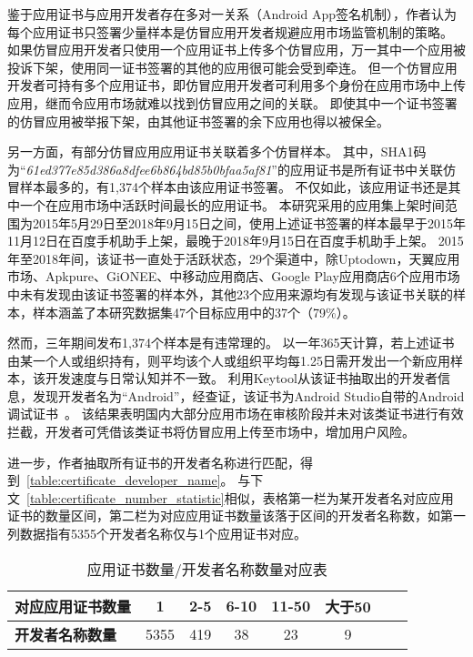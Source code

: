 鉴于应用证书与应用开发者存在多对一关系（Android App签名机制），作者认为每个应用证书只签署少量样本是仿冒应用开发者规避应用市场监管机制的策略。
如果仿冒应用开发者只使用一个应用证书上传多个仿冒应用，万一其中一个应用被投诉下架，使用同一证书签署的其他的应用很可能会受到牵连。
但一个仿冒应用开发者可持有多个应用证书，即仿冒应用开发者可利用多个身份在应用市场中上传应用，继而令应用市场就难以找到仿冒应用之间的关联。
即使其中一个证书签署的仿冒应用被举报下架，由其他证书签署的余下应用也得以被保全。

另一方面，有部分仿冒应用应用证书关联着多个仿冒样本。
其中，SHA1码为``\emph{61ed377e85d386a8dfee6b864bd85b0bfaa5af81}''的应用证书是所有证书中关联仿冒样本最多的，有1,374个样本由该应用证书签署。
不仅如此，该应用证书还是其中一个在应用市场中活跃时间最长的应用证书。
本研究采用的应用集上架时间范围为2015年5月29日至2018年9月15日之间，使用上述证书签署的样本最早于2015年11月12日在百度手机助手上架，最晚于2018年9月15日在百度手机助手上架。
2015年至2018年间，该证书一直处于活跃状态，29个渠道中，除Uptodown，天翼应用市场、Apkpure、GiONEE、中移动应用商店、Google Play应用商店6个应用市场中未有发现由该证书签署的样本外，其他23个应用来源均有发现与该证书关联的样本，样本涵盖了本研究数据集47个目标应用中的37个（79\%）。

然而，三年期间发布1,374个样本是有违常理的。
以一年365天计算，若上述证书由某一个人或组织持有，则平均该个人或组织平均每1.25日需开发出一个新应用样本，该开发速度与日常认知并不一致。
利用Keytool从该证书抽取出的开发者信息，发现开发者名为``Android''，经查证，该证书为Android Studio自带的Android调试证书~\cite{UICC_cert}。
该结果表明国内大部分应用市场在审核阶段并未对该类证书进行有效拦截，开发者可凭借该类证书将仿冒应用上传至市场中，增加用户风险。

进一步，作者抽取所有证书的开发者名称进行匹配，得到~\autoref{table:certificate_developer_name}。
与下文~\autoref{table:certificate_number_statistic}相似，表格第一栏为某开发者名对应应用证书的数量区间，第二栏为对应应用证书数量该落于区间的开发者名称数，如第一列数据指有5355个开发者名称仅与1个应用证书对应。

\begin{table}[htbp]
    \renewcommand{\arraystretch}{1}
    \footnotesize
    \centering
    \caption{应用证书数量/开发者名称数量对应表}
    \vspace{1mm}
    \begin{tabular}{l c c c c c c c}
        \toprule
        {\bf 对应应用证书数量} & {\bf 1} & {\bf 2-5} & {\bf 6-10} & {\bf 11-50} & {\bf 大于50} \\
        \midrule
        {\bf 开发者名称数量}   & 5355    & 419       & 38         & 23          & 9            \\
        \bottomrule
    \end{tabular}
    \label{table:certificate_developer_name}
\end{table}


